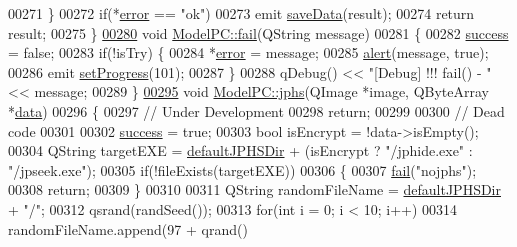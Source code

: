 \begin{DoxyCode}
00271     \}
00272     \textcolor{keywordflow}{if}(*\hyperlink{class_model_p_c_a4e5a9c0ca1f06fe5bc478b6bf248c37c}{error} == \textcolor{stringliteral}{"ok"})
00273         emit \hyperlink{class_model_p_c_a0855107fb0ccc247cd9e893fae9bb08a}{saveData}(result);
00274     \textcolor{keywordflow}{return} result;
00275 \}
\hypertarget{modelpc_8cpp_source.tex_l00280}{}\hyperlink{class_model_p_c_a47464b59b7e37fcee25e55475708aabd}{00280} \textcolor{keywordtype}{void} \hyperlink{class_model_p_c_a47464b59b7e37fcee25e55475708aabd}{ModelPC::fail}(QString message)
00281 \{
00282     \hyperlink{class_model_p_c_a945ffbbc44a832b953c191debd448f4c}{success} = \textcolor{keyword}{false};
00283     \textcolor{keywordflow}{if}(!isTry) \{
00284         *\hyperlink{class_model_p_c_a4e5a9c0ca1f06fe5bc478b6bf248c37c}{error} = message;
00285         \hyperlink{class_model_p_c_a9079a101d83672aa48fd2dbac797de40}{alert}(message, \textcolor{keyword}{true});
00286         emit \hyperlink{class_model_p_c_afdcd80f0ed5062e145a71f09b0897547}{setProgress}(101);
00287     \}
00288     qDebug() << \textcolor{stringliteral}{"[Debug] !!! fail() - "} << message;
00289 \}
\hypertarget{modelpc_8cpp_source.tex_l00295}{}\hyperlink{class_model_p_c_a8bee0255c09449868c7e6097afaaf0cd}{00295} \textcolor{keywordtype}{void} \hyperlink{class_model_p_c_a8bee0255c09449868c7e6097afaaf0cd}{ModelPC::jphs}(QImage *image, QByteArray *\hyperlink{namespace_errors_dict_setup_af570460846fb9f0c91abd308a095dcdc}{data})
00296 \{
00297     \textcolor{comment}{// Under Development}
00298     \textcolor{keywordflow}{return};
00299 
00300     \textcolor{comment}{// Dead code}
00301 
00302     \hyperlink{class_model_p_c_a945ffbbc44a832b953c191debd448f4c}{success} = \textcolor{keyword}{true};
00303     \textcolor{keywordtype}{bool} isEncrypt = !data->isEmpty();
00304     QString targetEXE = \hyperlink{class_model_p_c_abd038306f14f22fb885a1697c96d6335}{defaultJPHSDir} + (isEncrypt ? \textcolor{stringliteral}{"/jphide.exe"} : \textcolor{stringliteral}{"/jpseek.exe"});
00305     \textcolor{keywordflow}{if}(!fileExists(targetEXE))
00306     \{
00307         \hyperlink{class_model_p_c_a47464b59b7e37fcee25e55475708aabd}{fail}(\textcolor{stringliteral}{"nojphs"});
00308         \textcolor{keywordflow}{return};
00309     \}
00310 
00311     QString randomFileName = \hyperlink{class_model_p_c_abd038306f14f22fb885a1697c96d6335}{defaultJPHSDir} + \textcolor{stringliteral}{"/"};
00312     qsrand(randSeed());
00313     \textcolor{keywordflow}{for}(\textcolor{keywordtype}{int} i = 0; i < 10; i++)
00314         randomFileName.append(97 + qrand() %

\end{DoxyCode}
